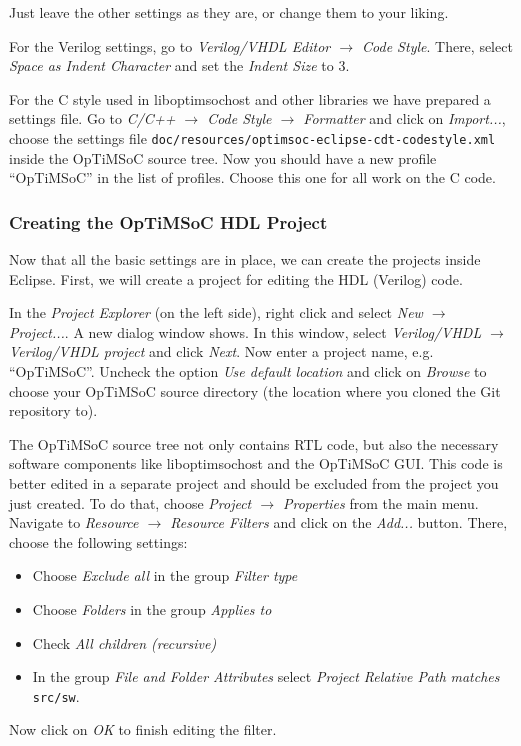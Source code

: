 Just leave the other settings as they are, or change them to your liking.

For the Verilog settings, go to \emph{Verilog/VHDL Editor $\rightarrow$ Code
Style}. There, select \emph{Space as Indent Character} and set the \emph{Indent
Size} to 3.

For the C style used in liboptimsochost and other libraries we have prepared a
settings file. Go to \emph{C/C++ $\rightarrow$ Code Style $\rightarrow$
Formatter} and click on \emph{Import...}, choose the settings file
\verb|doc/resources/optimsoc-eclipse-cdt-codestyle.xml| inside the OpTiMSoC
source tree. Now you should have a new profile ``OpTiMSoC'' in the list of
profiles. Choose this one for all work on the C code.

\subsubsection{Creating the OpTiMSoC HDL Project}

Now that all the basic settings are in place, we can create the projects inside
Eclipse. First, we will create a project for editing the HDL (Verilog) code.

In the \emph{Project Explorer} (on the left side), right click and select
\emph{New $\rightarrow$ Project...}. A new dialog window shows. In this window,
select \emph{Verilog/VHDL $\rightarrow$ Verilog/VHDL project} and click
\emph{Next}. Now enter a project name, e.g. ``OpTiMSoC''. Uncheck the option
\emph{Use default location} and click on \emph{Browse} to choose your OpTiMSoC
source directory (the location where you cloned the Git repository to).

The OpTiMSoC source tree not only contains RTL code, but also the necessary
software components like liboptimsochost and the OpTiMSoC GUI. This code is
better edited in a separate project and should be excluded from the project you
just created. To do that, choose \emph{Project $\rightarrow$
Properties} from the main menu. Navigate to \emph{Resource $\rightarrow$
Resource Filters} and click on the \emph{Add...} button. There, choose the
following settings:
\begin{itemize}
 \item Choose \emph{Exclude all} in the group \emph{Filter type}
 \item Choose \emph{Folders} in the group \emph{Applies to}
 \item Check \emph{All children (recursive)}
 \item In the group \emph{File and Folder Attributes} select
\emph{Project Relative Path} \emph{matches} \verb|src/sw|.
\end{itemize}
Now click on \emph{OK} to finish editing the filter.

